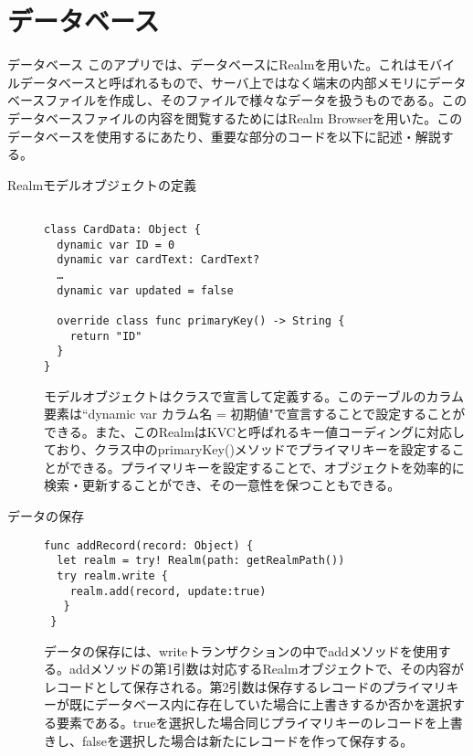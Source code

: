 \section{データベース}
データベース
このアプリでは、データベースにRealmを用いた。これはモバイルデータベースと呼ばれるもので、サーバ上ではなく端末の内部メモリにデータベースファイルを作成し、そのファイルで様々なデータを扱うものである。このデータベースファイルの内容を閲覧するためにはRealm Browserを用いた。このデータベースを使用するにあたり、重要な部分のコードを以下に記述・解説する。
 
\begin{description}
\item[Realmモデルオブジェクトの定義]\mbox{} 
\begin{lstlisting}[basicstyle=\ttfamily\footnotesize, frame=single]
 
class CardData: Object {   
  dynamic var ID = 0
  dynamic var cardText: CardText?
  …
  dynamic var updated = false

  override class func primaryKey() -> String {
    return "ID"
  }
}
 \end{lstlisting}
 
モデルオブジェクトはクラスで宣言して定義する。このテーブルのカラム要素は``dynamic var カラム名 = 初期値"で宣言することで設定することができる。また、このRealmはKVCと呼ばれるキー値コーディングに対応しており、クラス中のprimaryKey()メソッドでプライマリキーを設定することができる。プライマリキーを設定することで、オブジェクトを効率的に検索・更新することができ、その一意性を保つこともできる。
\end{description}
 
\begin{description}
\item[データの保存]\mbox{} 
\begin{lstlisting}[basicstyle=\ttfamily\footnotesize, frame=single]
func addRecord(record: Object) {
  let realm = try! Realm(path: getRealmPath())
  try realm.write {
    realm.add(record, update:true)
   }
 }
\end{lstlisting}
 
データの保存には、writeトランザクションの中でaddメソッドを使用する。addメソッドの第1引数は対応するRealmオブジェクトで、その内容がレコードとして保存される。第2引数は保存するレコードのプライマリキーが既にデータベース内に存在していた場合に上書きするか否かを選択する要素である。trueを選択した場合同じプライマリキーのレコードを上書きし、falseを選択した場合は新たにレコードを作って保存する。
\end{description}
 
